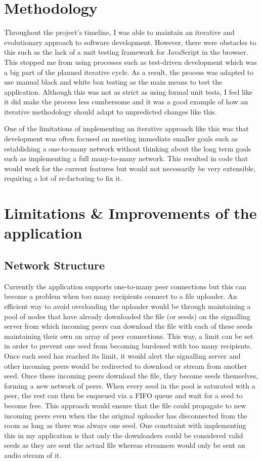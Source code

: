 \documentclass[]{report}
\begin{document}
		\section{Methodology}
		Throughout the project's timeline, I was able to maintain an iterative and evolutionary approach to software development. However, there were obstacles to this such as the lack of a unit testing framework for JavaScript in the browser. This stopped me from using processes such as test-driven development which was a big part of the planned iterative cycle. As a result, the process was adapted to use manual black and white box testing as the main means to test the application. Although this was not as strict as using formal unit tests, I feel like it did make the process less cumbersome and it was a good example of how an iterative methodology should adapt to unpredicted changes like this.
		
		One of the limitations of implementing an iterative approach like this was that development was often focused on meeting immediate smaller goals such as establishing a one-to-many network without thinking about the long term goals such as implementing a full many-to-many network. This resulted in code that would work for the current features but would not necessarily be very extensible, requiring a lot of re-factoring to fix it.
	
		\section{Limitations \& Improvements of the application}
			\subsection{Network Structure}
			Currently the application supports one-to-many peer connections but this can become a problem when too many recipients connect to a file uploader. An efficient way to avoid overloading the uploader would be through maintaining a pool of nodes that have already downloaded the file (or seeds) on the signalling server from which incoming peers can download the file with each of these seeds maintaining their own an array of peer connections. This way, a limit can be set in order to prevent one seed from becoming burdened with too many recipients. Once each seed has reached its limit, it would alert the signalling server and other incoming peers would be redirected to download or stream from another seed. Once these incoming peers download the file, they become seeds themselves, forming a new network of peers. When every seed in the pool is saturated with a peer, the rest can then be enqueued via a FIFO queue and wait for a seed to become free. This approach would ensure that the file could propagate to new incoming peers even when the the original uploader has disconnected from the room as long as there was always one seed. One constraint with implementing this in my application is that only the downloaders could be considered valid seeds as they are sent the actual file whereas streamers would only be sent an audio stream of it.
			
\end{document}
